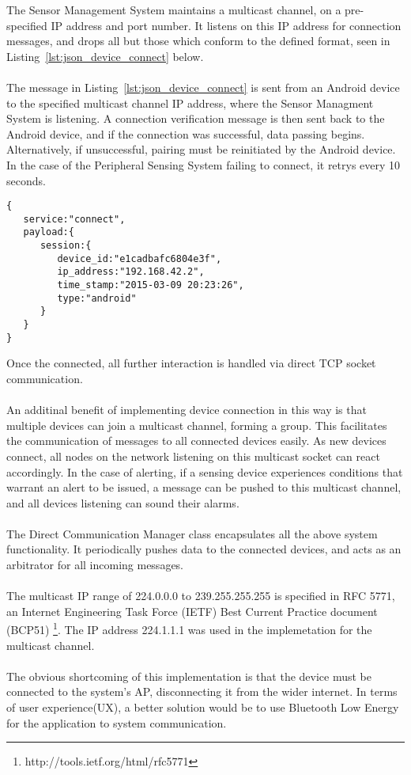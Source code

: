 \documentclass{article}
\begin{document}
The Sensor Management System maintains a multicast channel, on a pre-specified IP address and port number. It listens on this IP address for connection messages, and drops all but those which conform to the defined format, seen in Listing~\ref{lst:json_device_connect} below. \\\\
The message in Listing~\ref{lst:json_device_connect} is sent from an Android device to the specified multicast channel IP address, where the Sensor Managment System is listening. A connection verification message is then sent back to the Android device, and if the connection was successful, data passing begins. Alternatively, if unsuccessful, pairing must be reinitiated by the Android device. In the case of the Peripheral Sensing System failing to connect, it retrys every 10 seconds.
\begin{lstlisting}[caption={JSON Connection Message Object},label={lst:json_device_connect}]
{  
   service:"connect",
   payload:{  
      session:{  
         device_id:"e1cadbafc6804e3f",
         ip_address:"192.168.42.2",
         time_stamp:"2015-03-09 20:23:26",
         type:"android"
      }
   }
}
\end{lstlisting}
Once the connected, all further interaction is handled via direct TCP socket communication.\\\\
An additinal benefit of implementing device connection in this way is that multiple devices can join a multicast channel, forming a group. This facilitates the communication of messages to all connected devices easily. As new devices connect, all nodes on the network listening on this multicast socket can react accordingly. In the case of alerting, if a sensing device experiences conditions that warrant an alert to be issued, a message can be pushed to this multicast channel, and all devices listening can sound their alarms. \\\\
The Direct Communication Manager class encapsulates all the above system functionality. It periodically pushes data to the connected devices, and acts as an arbitrator for all incoming messages.\\\\
The multicast IP range of 224.0.0.0 to 239.255.255.255 is specified in RFC 5771, an Internet Engineering Task Force (IETF) Best Current Practice document (BCP51)
\footnote{http://tools.ietf.org/html/rfc5771}. The IP address 224.1.1.1 was used in the implemetation for the multicast channel. \\\\
The obvious shortcoming of this implementation is that the device must be connected to the system\rq s AP, disconnecting it from the wider internet. In terms of user experience(UX), a better solution would be to use Bluetooth Low Energy for the application to system communication. 
\end{document}
